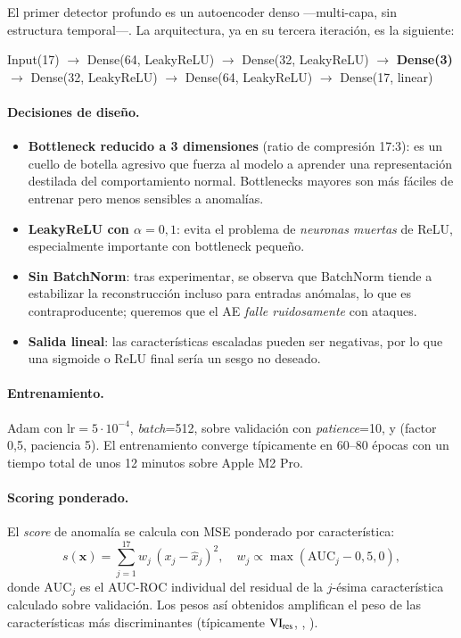 El primer detector profundo es un autoencoder denso ---multi-capa, sin estructura temporal---. La arquitectura, ya en su tercera iteración, es la siguiente:

\begin{center}
\textsf{Input(17)} $\to$ Dense(64, LeakyReLU) $\to$ Dense(32, LeakyReLU) $\to$ \textbf{Dense(3)} \\
$\to$ Dense(32, LeakyReLU) $\to$ Dense(64, LeakyReLU) $\to$ Dense(17, linear)
\end{center}

\paragraph{Decisiones de diseño.}
\begin{itemize}[leftmargin=*,topsep=0pt]
  \item \textbf{Bottleneck reducido a 3 dimensiones} (ratio de compresión 17:3): es un cuello de botella agresivo que fuerza al modelo a aprender una representación destilada del comportamiento normal. Bottlenecks mayores son más fáciles de entrenar pero menos sensibles a anomalías.
  \item \textbf{LeakyReLU con $\alpha=0{,}1$}: evita el problema de \emph{neuronas muertas} de ReLU, especialmente importante con bottleneck pequeño.
  \item \textbf{Sin BatchNorm}: tras experimentar, se observa que BatchNorm tiende a estabilizar la reconstrucción incluso para entradas anómalas, lo que es contraproducente; queremos que el AE \emph{falle ruidosamente} con ataques.
  \item \textbf{Salida lineal}: las características escaladas pueden ser negativas, por lo que una sigmoide o ReLU final sería un sesgo no deseado.
\end{itemize}

\paragraph{Entrenamiento.} Adam con $\mathrm{lr}=5\cdot 10^{-4}$, \emph{batch}=512,  sobre validación con \emph{patience}=10, y  (factor 0{,}5, paciencia 5). El entrenamiento converge típicamente en 60--80 épocas con un tiempo total de unos 12 minutos sobre Apple M2 Pro.

\paragraph{Scoring ponderado.} El \emph{score} de anomalía se calcula con MSE ponderado por característica:
\begin{equation}
s(\bm{x}) = \sum_{j=1}^{17} w_j \, (x_j - \hat x_j)^2, \quad w_j \propto \max(\mathrm{AUC}_j - 0{,}5, 0),
\end{equation}
donde $\mathrm{AUC}_j$ es el AUC-ROC individual del residual de la $j$-ésima característica calculado sobre validación. Los pesos así obtenidos amplifican el peso de las características más discriminantes (típicamente $\mathrm{VI}_{\text{res}}$, , ).

